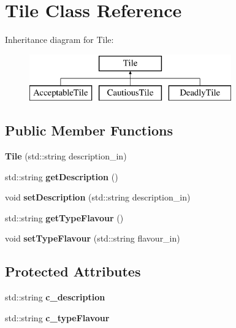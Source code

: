 \hypertarget{class_tile}{}\section{Tile Class Reference}
\label{class_tile}
Inheritance diagram for Tile\+:\begin{figure}[H]
\begin{center}
\leavevmode
\includegraphics[height=2.000000cm]{class_tile}
\end{center}
\end{figure}
\subsection*{Public Member Functions}
\begin{DoxyCompactItemize}
\item 
\mbox{\label{class_tile_a1e254991b6e99eb754bce211ae5bd969}} 
{\bfseries Tile} (std\+::string description\+\_\+in)
\item 
\mbox{\label{class_tile_a569a1cbd84b748af931a064efc5ef495}} 
std\+::string {\bfseries get\+Description} ()
\item 
\mbox{\label{class_tile_a4d1bce0f39797278bf96c7dffa569528}} 
void {\bfseries set\+Description} (std\+::string description\+\_\+in)
\item 
\mbox{\label{class_tile_a975419006795f85a717c47e7cc899f28}} 
std\+::string {\bfseries get\+Type\+Flavour} ()
\item 
\mbox{\label{class_tile_af1937e0abd76ae02f19dcb578b7de98e}} 
void {\bfseries set\+Type\+Flavour} (std\+::string flavour\+\_\+in)
\end{DoxyCompactItemize}
\subsection*{Protected Attributes}
\begin{DoxyCompactItemize}
\item 
\mbox{\label{class_tile_a2ffdf4fa34e95ee70c119233685e244f}} 
std\+::string {\bfseries c\+\_\+description}
\item 
\mbox{\label{class_tile_a539bf1c90534a9f2c23cae347e0040fe}} 
std\+::string {\bfseries c\+\_\+type\+Flavour}
\end{DoxyCompactItemize}


